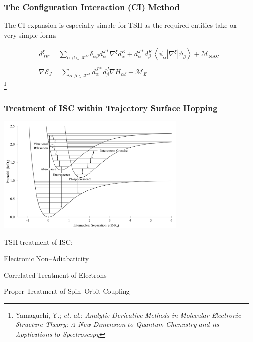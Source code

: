 \documentclass[usepdftitle=false,10pt]{beamer}
\newcommand{\cmark}{\color{green} \ding{51}}%
\newcommand{\done}{\rlap{$\square$}{\raisebox{2pt}{\large\hspace{1pt}\cmark}}%
\hspace{-2.5pt}}
\newcommand{\innerop}[3]{\left\langle #1 \left\vert #2 \right\vert #3 \right\rangle}  %
\newcommand\blfootnote[1]{%
  \begingroup
  \renewcommand\thefootnote{}\footnote{#1}%
  \addtocounter{footnote}{-1}%
  \endgroup
}
\begin{document}
\begin{frame}
  \frametitle{The Configuration Interaction (CI) Method}

  The CI expansion is especially simple for TSH as the required entities take on
  very simple forms

  \begin{align*}
    &d_{JK}^\xi = \sum_{\alpha,\beta \in \mathcal{K}^N} 
      \delta_{\alpha\beta} d_\alpha^{J*} \nabla^\xi d_\alpha^K +
      d_\alpha^{J*} d_\beta^K 
      \innerop{\psi_\alpha}{\nabla^\xi}{\psi_\beta} +
      \mathcal{M}_\mathrm{NAC} \\ \\
    &\nabla \mathcal{E}_J = \sum_{\alpha,\beta \in \mathcal{K}^N} 
      d_\alpha^{J*} d_\beta^J \nabla H_{\alpha\beta} +
      \mathcal{M}_E
  \end{align*}
  \blfootnote{\tiny Yamaguchi, Y.; \emph{et. al.}; \emph{Analytic Derivative Methods in Molecular Electronic Structure Theory: A New Dimension to Quantum Chemistry and its Applications to Spectroscopy}}
\end{frame}

\begin{frame}
  \frametitle{Treatment of ISC within Trajectory Surface Hopping}
  \begin{center}
  \includegraphics[width=0.7\textwidth]{ISC} 
  \end{center}
  \vspace{-0.5cm}
  TSH treatment of ISC: 
  \begin{mylist}
    \item[\done] Electronic Non--Adiabaticity
    \item[\done] Correlated Treatment of Electrons
    \item Proper Treatment of Spin--Orbit Coupling
  \end{mylist}
\end{frame}
\end{document}
